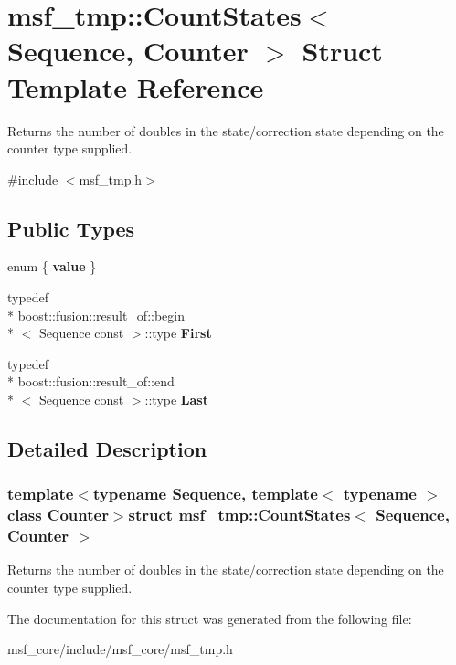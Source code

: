 \hypertarget{structmsf__tmp_1_1CountStates}{\section{msf\-\_\-tmp\-:\-:Count\-States$<$ Sequence, Counter $>$ Struct Template Reference}
\label{structmsf__tmp_1_1CountStates}
}


Returns the number of doubles in the state/correction state depending on the counter type supplied.  




{\ttfamily \#include $<$msf\-\_\-tmp.\-h$>$}

\subsection*{Public Types}
\begin{DoxyCompactItemize}
\item 
enum \{ {\bfseries value}
 \}
\item 
\hypertarget{structmsf__tmp_1_1CountStates_acbf60b9f084215f06ff6be0777f28714}{typedef \\*
boost\-::fusion\-::result\-\_\-of\-::begin\\*
$<$ Sequence const  $>$\-::type {\bfseries First}}\label{structmsf__tmp_1_1CountStates_acbf60b9f084215f06ff6be0777f28714}

\item 
\hypertarget{structmsf__tmp_1_1CountStates_aacfada144f8987a32c5be3a01c9d99c0}{typedef \\*
boost\-::fusion\-::result\-\_\-of\-::end\\*
$<$ Sequence const  $>$\-::type {\bfseries Last}}\label{structmsf__tmp_1_1CountStates_aacfada144f8987a32c5be3a01c9d99c0}

\end{DoxyCompactItemize}


\subsection{Detailed Description}
\subsubsection*{template$<$typename Sequence, template$<$ typename $>$ class Counter$>$struct msf\-\_\-tmp\-::\-Count\-States$<$ Sequence, Counter $>$}

Returns the number of doubles in the state/correction state depending on the counter type supplied. 

The documentation for this struct was generated from the following file\-:\begin{DoxyCompactItemize}
\item 
msf\-\_\-core/include/msf\-\_\-core/msf\-\_\-tmp.\-h\end{DoxyCompactItemize}
